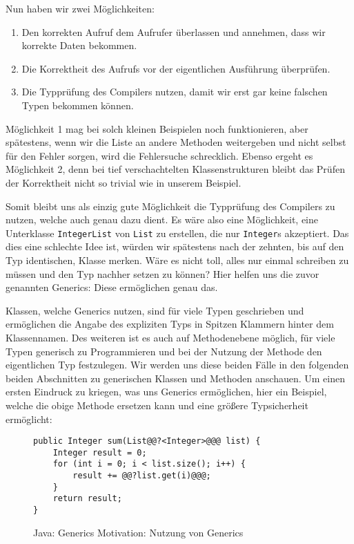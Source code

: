 		Nun haben wir zwei Möglichkeiten:
		\begin{enumerate}
			\item Den korrekten Aufruf dem Aufrufer überlassen und annehmen, dass wir korrekte Daten bekommen.
			\item Die Korrektheit des Aufrufs vor der eigentlichen Ausführung überprüfen.
			\item Die Typprüfung des Compilers nutzen, damit wir erst gar keine falschen Typen bekommen können.
		\end{enumerate}
		Möglichkeit 1 mag bei solch kleinen Beispielen noch funktionieren, aber spätestens, wenn wir die Liste an andere Methoden weitergeben und nicht selbst für den Fehler sorgen, wird die Fehlersuche schrecklich. Ebenso ergeht es Möglichkeit 2, denn bei tief verschachtelten Klassenstrukturen bleibt das Prüfen der Korrektheit nicht so trivial wie in unserem Beispiel.
		
		
		Somit bleibt uns als einzig gute Möglichkeit die Typprüfung des Compilers zu nutzen, welche auch genau dazu dient. Es wäre also eine Möglichkeit, eine Unterklasse \texttt{IntegerList} von \texttt{List} zu erstellen, die nur \texttt{Integer}s akzeptiert. Das dies eine schlechte Idee ist, würden wir spätestens nach der zehnten, bis auf den Typ identischen, Klasse merken. Wäre es nicht toll, alles nur einmal schreiben zu müssen und den Typ nachher setzen zu können? Hier helfen uns die zuvor genannten Generics: Diese ermöglichen genau das.
		
		Klassen, welche Generics nutzen, sind für viele Typen geschrieben und ermöglichen die Angabe des expliziten Typs in Spitzen Klammern hinter dem Klassennamen. Des weiteren ist es auch auf Methodenebene möglich, für viele Typen generisch zu Programmieren und bei der Nutzung der Methode den eigentlichen Typ festzulegen. Wir werden uns diese beiden Fälle in den folgenden beiden Abschnitten zu generischen Klassen und Methoden anschauen. Um einen ersten Eindruck zu kriegen, was uns Generics ermöglichen, hier ein Beispiel, welche die obige Methode ersetzen kann und eine größere Typsicherheit ermöglicht:
		\begin{figure}[H]
			\centering
			\begin{lstlisting}
public Integer sum(List@@?<Integer>@@@ list) {
	Integer result = 0;
	for (int i = 0; i < list.size(); i++) {
		result += @@?list.get(i)@@@;
	}
	return result;
}
			\end{lstlisting}
			\caption{Java: Generics Motivation: Nutzung von Generics}
			\label{fig:java_generics_motivation_gen}
		\end{figure}
		
